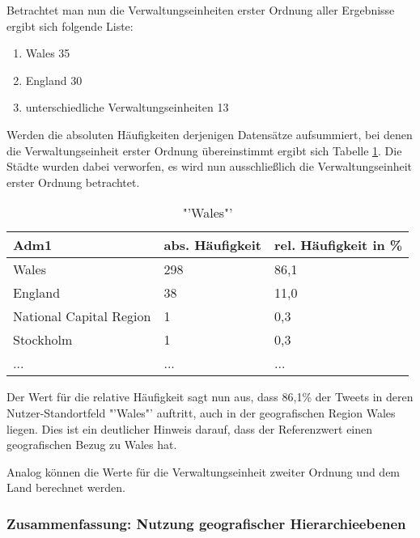 			Betrachtet man nun die Verwaltungseinheiten erster Ordnung aller Ergebnisse ergibt sich folgende Liste:

			\begin{enumerate}
				\item Wales 35
				\item England 30
				\item unterschiedliche Verwaltungseinheiten 13
			\end{enumerate}

			Werden die absoluten Häufigkeiten derjenigen Datensätze aufsummiert, bei denen die Verwaltungseinheit erster Ordnung übereinstimmt ergibt sich Tabelle \ref{tab:WalesVerw1}.
			Die Städte wurden dabei verworfen, es wird nun ausschließlich die Verwaltungseinheit erster Ordnung betrachtet.
			
			\begin{table}[h]
			\centering
			\caption{"'Wales"'}
			\label{tab:WalesVerw1}
			\begin{tabular}{|l|l|l|}
			\hline
			Adm1 & abs. Häufigkeit & rel. Häufigkeit in \% \\ \hline \hline
			Wales                   & 298 & 86,1 \\ \hline
			England                 & 38  & 11,0 \\ \hline
			National Capital Region & 1   & 0,3  \\ \hline
			Stockholm               & 1   & 0,3  \\ \hline
			... & ... & ... \\ \hline
			\end{tabular}
			\end{table}  

			Der Wert für die relative Häufigkeit sagt nun aus, dass 86,1\% der Tweets in deren Nutzer-Standortfeld "'Wales"' auftritt, auch in der geografischen Region Wales liegen.
			Dies ist ein deutlicher Hinweis darauf, dass der Referenzwert einen geografischen Bezug zu Wales hat.

			Analog können die Werte für die Verwaltungseinheit zweiter Ordnung und dem Land berechnet werden.

		\subsubsection{Zusammenfassung: Nutzung geografischer Hierarchieebenen}

